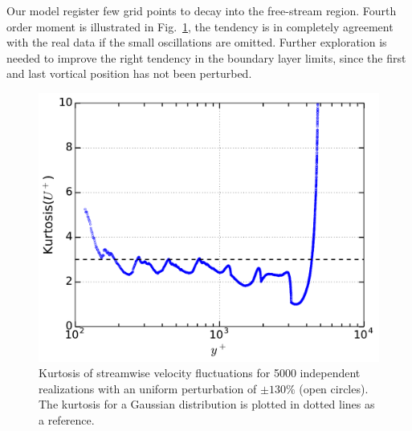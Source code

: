 \documentclass[aps,reprint,amsmath,amssymb,pra]{revtex4-1}%
\begin{document}
Our model register few grid points to decay into the free-stream region. Fourth order moment is illustrated in Fig.~\ref{fig:kurtun130}, the tendency is in completely agreement with the real data if the small oscillations are omitted. Further exploration is needed to improve the right tendency in the boundary layer limits, since the first and last vortical position has not been perturbed.
\begin{figure}[tb] 
\includegraphics[scale=0.46]{figures/kurtosis_5000_assembles_un130}
\caption{\label{fig:kurtun130} Kurtosis of streamwise velocity fluctuations for 5000 independent realizations with an uniform perturbation of $\pm 130\%$ (open circles). The kurtosis for a Gaussian distribution is plotted in dotted lines as a reference.}
\end{figure}


\end{document}
